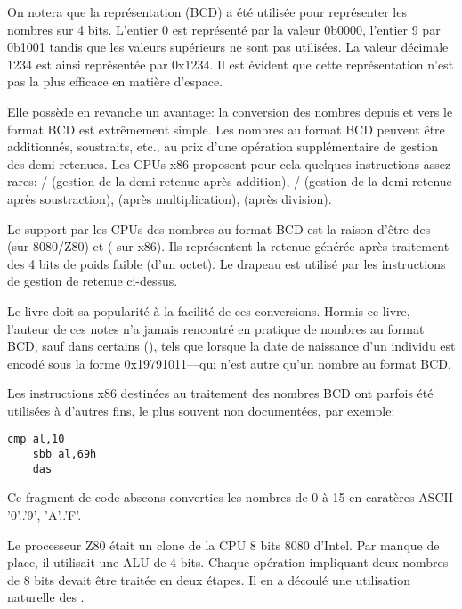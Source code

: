 On notera que la représentation  (\ac{BCD}) a été utilisée pour représenter les nombres sur 4 bits.
L'entier 0 est représenté par la valeur 0b0000, l'entier 9 par 0b1001 tandis que les valeurs supérieurs ne sont pas utilisées.
La valeur décimale 1234 est ainsi représentée par 0x1234.
Il est évident que cette représentation n'est pas la plus efficace en matière d'espace.

Elle possède en revanche un avantage: la conversion des nombres depuis et vers le format \ac{BCD} est extrêmement simple.
Les nombres au format BCD peuvent être additionnés, soustraits, etc., au prix d'une opération supplémentaire de gestion des demi-retenues.
Les CPUs x86 proposent pour cela quelques instructions assez rares:
/ (gestion de la demi-retenue après addition),
/ (gestion de la demi-retenue après soustraction),
 (après multiplication),
 (après division).

Le support par les CPUs des nombres au format \ac{BCD} est la raison d'être des  (sur 8080/Z80) et
 ( sur x86).
Ils représentent la retenue générée après traitement des 4 bits de poids faible (d'un octet).
Le drapeau est utilisé par les instructions de gestion de retenue ci-dessus.

Le livre  doit sa popularité à la facilité de ces conversions.
Hormis ce livre, l'auteur de ces notes n'a jamais rencontré en pratique de nombres au format \ac{BCD}, sauf dans certains
 (),
tels que lorsque la date de naissance d'un individu est encodé sous la forme 0x19791011---qui n'est autre qu'un nombre au format \ac{BCD}.

Les instructions x86 destinées au traitement des nombres \ac{BCD} ont parfois été utilisées à d'autres fins, le plus souvent non documentées, par exemple:

\begin{lstlisting}[style=customasmx86]
	cmp al,10
	sbb al,69h
	das
\end{lstlisting}

Ce fragment de code abscons converties les nombres de 0 à 15 en caratères \ac{ASCII} '0'..'9', 'A'..'F'.


Le processeur Z80 était un clone de la CPU 8 bits 8080 d'Intel. Par manque de place, il utilisait une \ac{ALU} de 4 bits.
Chaque opération impliquant deux nombres de 8 bits devait être traitée en deux étapes.
Il en a découlé une utilisation naturelle des .

